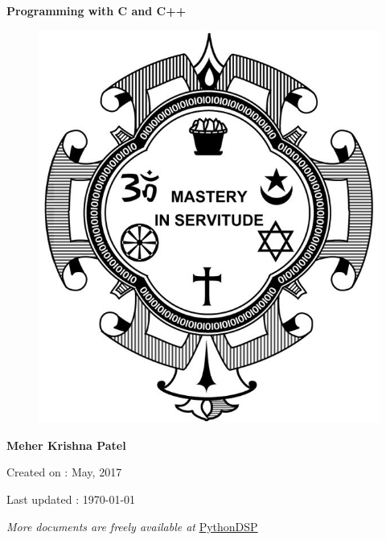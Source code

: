 \begin{titlepage}	
	\centering
	
	\vspace*{40mm} %
	\textbf{\Huge {Programming with C and C++}}
	
	\vspace{0mm}
	\begin{figure}[!h]
		\centering
		\includegraphics[scale=0.3]{title-page/logo.jpg}
	\end{figure}
	
	\vspace{0mm} 
	\Large \textbf{{Meher Krishna Patel}}
	
	\small Created on : May, 2017
	
	\vspace*{0mm}
	\small  Last updated : \MonthYearFormat\today
	
	
	\vfill
	\small \textit{More documents are freely available at }{\href{http://pythondsp.readthedocs.io/en/latest/pythondsp/toc.html}{PythonDSP}}	
\end{titlepage}

